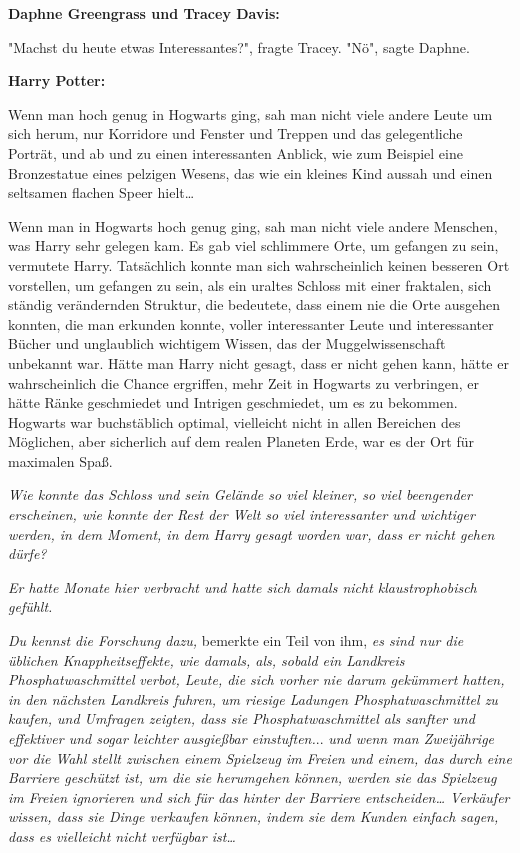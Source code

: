 {\textbf{Daphne Greengrass und Tracey Davis:}

"Machst du heute etwas Interessantes?", fragte Tracey. "Nö", sagte Daphne.

\textbf{Harry Potter:}

Wenn man hoch genug in Hogwarts ging, sah man nicht viele andere Leute um sich herum, nur Korridore und Fenster und Treppen und das gelegentliche Porträt, und ab und zu einen interessanten Anblick, wie zum Beispiel eine Bronzestatue eines pelzigen Wesens, das wie ein kleines Kind aussah und einen seltsamen flachen Speer hielt…

Wenn man in Hogwarts hoch genug ging, sah man nicht viele andere Menschen, was Harry sehr gelegen kam. Es gab viel schlimmere Orte, um gefangen zu sein, vermutete Harry. Tatsächlich konnte man sich wahrscheinlich keinen besseren Ort vorstellen, um gefangen zu sein, als ein uraltes Schloss mit einer fraktalen, sich ständig verändernden Struktur, die bedeutete, dass einem nie die Orte ausgehen konnten, die man erkunden konnte, voller interessanter Leute und interessanter Bücher und unglaublich wichtigem Wissen, das der Muggelwissenschaft unbekannt war. Hätte man Harry nicht gesagt, dass er nicht gehen kann, hätte er wahrscheinlich die Chance ergriffen, mehr Zeit in Hogwarts zu verbringen, er hätte Ränke geschmiedet und Intrigen geschmiedet, um es zu bekommen. Hogwarts war buchstäblich optimal, vielleicht nicht in allen Bereichen des Möglichen, aber sicherlich auf dem realen Planeten Erde, war es der Ort für maximalen Spaß.

\emph{Wie konnte das Schloss und sein Gelände so viel kleiner, so viel beengender erscheinen, wie konnte der Rest der Welt so viel interessanter und wichtiger werden, in dem Moment, in dem Harry gesagt worden war, dass er nicht gehen dürfe?}

\emph{Er hatte Monate hier verbracht und hatte sich damals nicht klaustrophobisch gefühlt.}

\emph{Du kennst die Forschung dazu,} bemerkte ein Teil von ihm, \emph{es sind nur die üblichen Knappheitseffekte, wie damals, als, sobald ein Landkreis Phosphatwaschmittel} \emph{verbot, Leute, die sich vorher nie darum gekümmert hatten, in den nächsten Landkreis fuhren, um riesige Ladungen Phosphatwaschmittel zu kaufen, und Umfragen zeigten, dass sie Phosphatwaschmittel als sanfter und effektiver und sogar leichter ausgießbar einstuften.}.. \emph{und wenn man Zweijährige vor die Wahl stellt zwischen einem Spielzeug im Freien und einem, das durch eine Barriere geschützt ist, um die sie herumgehen können, werden sie das Spielzeug im Freien ignorieren und sich für das hinter der Barriere entscheiden… Verkäufer wissen, dass sie Dinge verkaufen können, indem sie dem Kunden einfach sagen, dass es vielleicht nicht verfügbar ist…}

}
